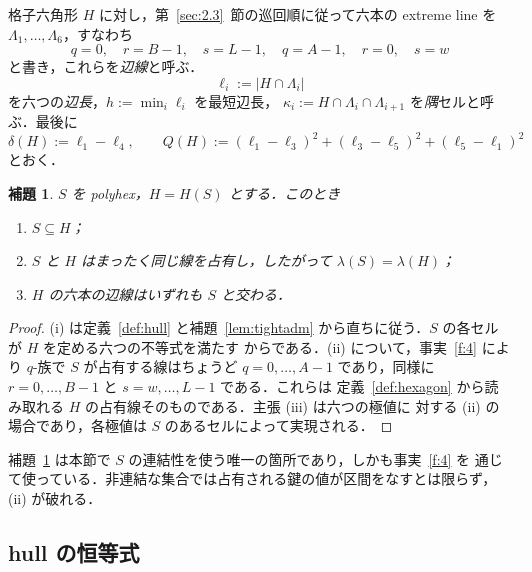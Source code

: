 \documentclass[11pt]{article}
\theoremstyle{plain}
\newtheorem{lemma}[theorem]{補題}
\theoremstyle{definition}
\theoremstyle{remark}
\begin{document}
格子六角形 \(H\) に対し，第~\ref{sec:2.3}~節の巡回順に従って六本の extreme line を
\(\Lambda_{1},\dots,\Lambda_{6}\)，すなわち
\[
   q=0,\quad r=B-1,\quad s=L-1,\quad q=A-1,\quad r=0,\quad s=w
\]
と書き，これらを\emph{辺線}と呼ぶ．
\[
   \ell_{i}:=|H\cap\Lambda_{i}|
\]
を六つの\emph{辺長}，\(h:=\min_{i}\ell_{i}\) を最短辺長，
\(\kappa_{i}:=H\cap\Lambda_{i}\cap\Lambda_{i+1}\) を\emph{隅}セルと呼ぶ．最後に
\[
   \delta(H):=\ell_{1}-\ell_{4},
   \qquad
   Q(H):=(\ell_{1}-\ell_{3})^{2}+(\ell_{3}-\ell_{5})^{2}+(\ell_{5}-\ell_{1})^{2}
\]
とおく．

\begin{lemma}\label{lem:hull}
\(S\) を polyhex，\(H=H(S)\) とする．このとき
\begin{enumerate}
\item[(i)] \(S\subseteq H\)；
\item[(ii)] \(S\) と \(H\) はまったく同じ線を占有し，したがって \(\lambda(S)=\lambda(H)\)；
\item[(iii)] \(H\) の六本の辺線はいずれも \(S\) と交わる．
\end{enumerate}
\end{lemma}

\begin{proof}
(i) は定義~\ref{def:hull} と補題~\ref{lem:tightadm} から直ちに従う．\(S\) の各セルが \(H\) を定める六つの不等式を満たす
からである．(ii) について，事実~\ref{f:4} により \(q\)-族で \(S\) が占有する線はちょうど
\(q=0,\dots,A-1\) であり，同様に \(r=0,\dots,B-1\) と \(s=w,\dots,L-1\) である．これらは
定義~\ref{def:hexagon} から読み取れる \(H\) の占有線そのものである．主張 (iii) は六つの極値に
対する (ii) の場合であり，各極値は \(S\) のあるセルによって実現される．
\end{proof}

補題~\ref{lem:hull} は本節で \(S\) の連結性を使う唯一の箇所であり，しかも事実~\ref{f:4} を
通じて使っている．非連結な集合では占有される鍵の値が区間をなすとは限らず，(ii) が破れる．

\subsection{hull の恒等式}\label{sec:2.5}
\end{document}

